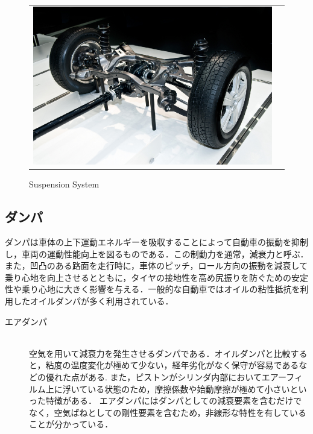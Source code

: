 \documentclass[a4paper,12pt]{article_vdlab_sotsuron}
\begin{document}
\vspace{10mm}
\begin{figure}[h!]
  \begin{tabular}{cc}
    \begin{minipage}{1.0\hsize}
      \begin{center}
	\includegraphics[scale = 1.0]{figure/pic_suspension.eps}
	\caption{Suspension System\cite{pic_sus.net}}
	\label{fig:suspension}
      \end{center}
     \end{minipage}
    \end{tabular}
\end{figure}

\newpage
\subsection{ダンパ}
ダンパは車体の上下運動エネルギーを吸収することによって自動車の振動を抑制し，車両の運動性能向上を図るものである．この制動力を通常，減衰力と呼ぶ\cite{chassis_handbook}．また，凹凸のある路面を走行時に，車体のピッチ，ロール方向の振動を減衰して乗り心地を向上させるとともに，タイヤの接地性を高め尻振りを防ぐための安定性や乗り心地に大きく影響を与える\cite{daisyarin}．一般的な自動車ではオイルの粘性抵抗を利用したオイルダンパが多く利用されている．

\begin{description}
 \item[エアダンパ]\mbox{}\\
 空気を用いて減衰力を発生させるダンパである．オイルダンパと比較すると，粘度の温度変化が極めて少ない，経年劣化がなく保守が容易であるなどの優れた点がある.
 また，ピストンがシリンダ内部においてエアーフィルム上に浮いている状態のため，摩擦係数や始動摩擦が極めて小さいといった特徴がある．
 エアダンパにはダンパとしての減衰要素を含むだけでなく，空気ばねとしての剛性要素を含むため，非線形な特性を有していることが分かっている\cite{thesis_airpot}．
\end{description}
\end{document}
